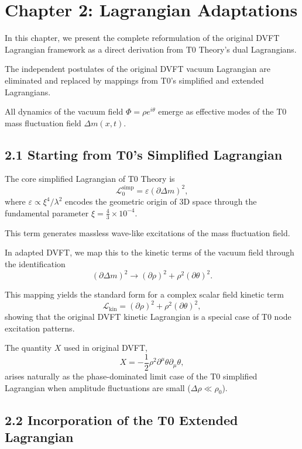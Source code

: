 	\section{Chapter 2: Lagrangian Adaptations}
	
	In this chapter, we present the complete reformulation of the original DVFT Lagrangian framework as a direct derivation from T0 Theory's dual Lagrangians.
	
	The independent postulates of the original DVFT vacuum Lagrangian are eliminated and replaced by mappings from T0's simplified and extended Lagrangians.
	
	All dynamics of the vacuum field $\Phi = \rho e^{i\theta}$ emerge as effective modes of the T0 mass fluctuation field $\Delta m(x,t)$.
	
	\subsection{2.1 Starting from T0's Simplified Lagrangian}
	
	The core simplified Lagrangian of T0 Theory is
	\[
	\mathcal{L}_0^{\text{simp}} = \varepsilon (\partial \Delta m)^2,
	\]
	where $\varepsilon \propto \xi^4 / \lambda^2$ encodes the geometric origin of 3D space through the fundamental parameter $\xi = \frac{4}{3} \times 10^{-4}$.
	
	This term generates massless wave-like excitations of the mass fluctuation field.
	
	In adapted DVFT, we map this to the kinetic terms of the vacuum field through the identification
	\[
	(\partial \Delta m)^2 \to (\partial \rho)^2 + \rho^2 (\partial \theta)^2.
	\]
	
	This mapping yields the standard form for a complex scalar field kinetic term
	\[
	\mathcal{L}_{\text{kin}} = (\partial \rho)^2 + \rho^2 (\partial \theta)^2,
	\]
	showing that the original DVFT kinetic Lagrangian is a special case of T0 node excitation patterns.
	
	The quantity $X$ used in original DVFT,
	\[
	X = -\frac{1}{2} \rho^2 \partial^\mu \theta \partial_\mu \theta,
	\]
	arises naturally as the phase-dominated limit case of the T0 simplified Lagrangian when amplitude fluctuations are small ($\Delta \rho \ll \rho_0$).
	
	\subsection{2.2 Incorporation of the T0 Extended Lagrangian}
	
